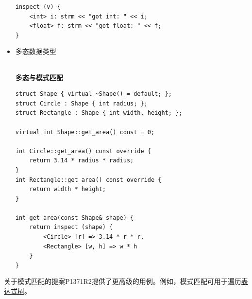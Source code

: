 \begin{itemize}
\begin{lstlisting}[style=styleCXX]
inspect (v) {
	<int> i: strm << "got int: " << i;
	<float> f: strm << "got float: " << f;
}
\end{lstlisting}

\item 
多态数据类型

\hspace*{\fill} \\ %
\noindent
\textbf{多态与模式匹配}
\begin{lstlisting}[style=styleCXX]
struct Shape { virtual ~Shape() = default; };
struct Circle : Shape { int radius; };
struct Rectangle : Shape { int width, height; };

virtual int Shape::get_area() const = 0;

int Circle::get_area() const override {
	return 3.14 * radius * radius;
}
int Rectangle::get_area() const override {
	return width * height;
}

int get_area(const Shape& shape) {
	return inspect (shape) {
		<Circle> [r] => 3.14 * r * r,
		<Rectangle> [w, h] => w * h
	}
}
\end{lstlisting}
\end{itemize}

关于模式匹配的提案P1371R2提供了更高级的用例。例如，模式匹配可用于遍历\href{https://en.wikipedia.org/wiki/Binary_expression_tree}{表达式树}。








